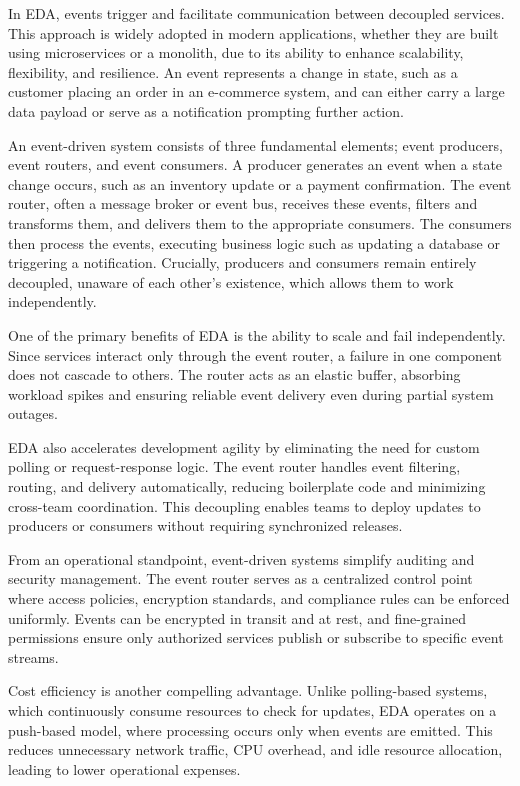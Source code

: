 \documentclass[]{final}
\begin{document}

In EDA, events trigger and facilitate communication between decoupled services.
This approach is widely adopted in modern applications, whether they are built
using microservices or a monolith, due to its ability to enhance scalability,
flexibility, and resilience. An event represents a change in state, such
as a customer placing an order in an e-commerce system, and can either
carry a large data payload or serve as a notification prompting further
action.

An event-driven system consists of three fundamental elements; event producers,
event routers, and event consumers. A producer generates an event when a
state change occurs, such as an inventory update or a payment confirmation.
The event router, often a message broker or event bus, receives these
events, filters and transforms them, and delivers them to the appropriate
consumers. The consumers then process the events, executing business logic
such as updating a database or triggering a notification. Crucially,
producers and consumers remain entirely decoupled, unaware of each other’s
existence, which allows them to work independently.

One of the primary benefits of EDA is the ability to scale and fail
independently. Since services interact only through the event router, a failure
in one component does not cascade to others. The router acts as an elastic
buffer, absorbing workload spikes and ensuring reliable event delivery even
during partial system outages.

EDA also accelerates development agility by eliminating the need for custom
polling or request-response logic. The event router handles event filtering,
routing, and delivery automatically, reducing boilerplate code and minimizing
cross-team coordination. This decoupling enables teams to deploy updates to
producers or consumers without requiring synchronized releases.

From an operational standpoint, event-driven systems simplify auditing and
security management. The event router serves as a centralized control point
where access policies, encryption standards, and compliance rules can be
enforced uniformly. Events can be encrypted in transit and at rest, and
fine-grained permissions ensure only authorized services publish or subscribe
to specific event streams.

Cost efficiency is another compelling advantage. Unlike polling-based systems,
which continuously consume resources to check for updates, EDA operates on a
push-based model, where processing occurs only when events are emitted. This
reduces unnecessary network traffic, CPU overhead, and idle resource allocation,
leading to lower operational expenses.
\end{document}
